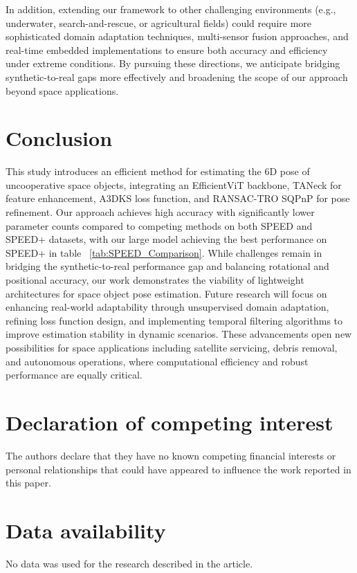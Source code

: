 \documentclass[a4paper,fleqn]{cas-sc}
\begin{document}
In addition, extending our framework to other challenging environments (e.g., 
underwater, search-and-rescue, or agricultural fields) could require more sophisticated 
domain adaptation techniques, multi-sensor fusion approaches, and real-time embedded 
implementations to ensure both accuracy and efficiency under extreme conditions. 
By pursuing these directions, we anticipate bridging synthetic-to-real gaps more effectively 
and broadening the scope of our approach beyond space applications.

\section{Conclusion} \label{sec:conclusion}
This study introduces an efficient method for estimating the 6D pose of uncooperative space objects, integrating an EfficientViT backbone, TANeck for feature enhancement, A3DKS loss function, and RANSAC-TRO SQPnP for pose refinement. Our approach achieves high accuracy with significantly lower parameter counts compared to competing methods on both SPEED and SPEED+ datasets, with our large model achieving the best performance on SPEED+ in table ~\ref{tab:SPEED_Comparison}. While challenges remain in bridging the synthetic-to-real performance gap and balancing rotational and positional accuracy, our work demonstrates the viability of lightweight architectures for space object pose estimation. Future research will focus on enhancing real-world adaptability through unsupervised domain adaptation, refining loss function design, and implementing temporal filtering algorithms to improve estimation stability in dynamic scenarios. These advancements open new possibilities for space applications including satellite servicing, debris removal, and autonomous operations, where computational efficiency and robust performance are equally critical.
\section*{Declaration of competing interest}

The authors declare that they have no known competing financial interests or personal relationships that could have appeared to influence the work reported in this paper.

\section*{Data availability}

No data was used for the research described in the article. 
\end{document}

